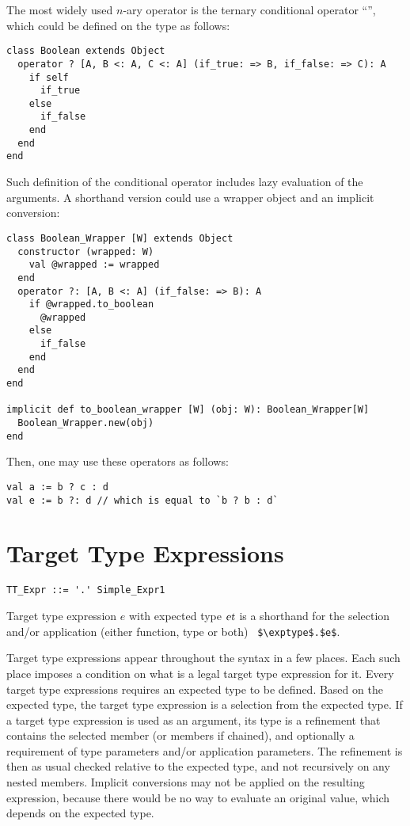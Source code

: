 \example The most widely used $n$-ary operator is the ternary conditional operator ``'', which could be defined on the  type as follows:

\begin{lstlisting}
class Boolean extends Object
  operator ? [A, B <: A, C <: A] (if_true: => B, if_false: => C): A
    if self
      if_true
    else
      if_false
    end
  end
end
\end{lstlisting}

Such definition of the conditional operator includes lazy evaluation of the arguments. A shorthand version could use a wrapper object and an implicit conversion:

\begin{lstlisting}
class Boolean_Wrapper [W] extends Object
  constructor (wrapped: W)
    val @wrapped := wrapped
  end
  operator ?: [A, B <: A] (if_false: => B): A
    if @wrapped.to_boolean
      @wrapped
    else
      if_false
    end
  end
end

implicit def to_boolean_wrapper [W] (obj: W): Boolean_Wrapper[W]
  Boolean_Wrapper.new(obj)
end
\end{lstlisting}

Then, one may use these operators as follows: 

\begin{lstlisting}
val a := b ? c : d
val e := b ?: d // which is equal to `b ? b : d`
\end{lstlisting}




\section{Target Type Expressions}
\label{sec:target-type-expressions}

\syntax\begin{lstlisting}
TT_Expr ::= '.' Simple_Expr1
\end{lstlisting}

Target type expression $e$ with expected type $\mbox{\sl et}$ is a shorthand for the selection and/or application (either function, type or both) ~\lstinline!$\exptype$.$e$!. 

Target type expressions appear throughout the syntax in a few places. Each such place imposes a condition on what is a legal target type expression for it. Every target type expressions requires an expected type to be defined. Based on the expected type, the target type expression is a selection from the expected type. If a target type expression is used as an argument, its type is a refinement that contains the selected member (or members if chained), and optionally a requirement of type parameters and/or application parameters. The refinement is then as usual checked relative to the expected type, and not recursively on any nested members. Implicit conversions may not be applied on the resulting expression, because there would be no way to evaluate an original value, which depends on the expected type. 


